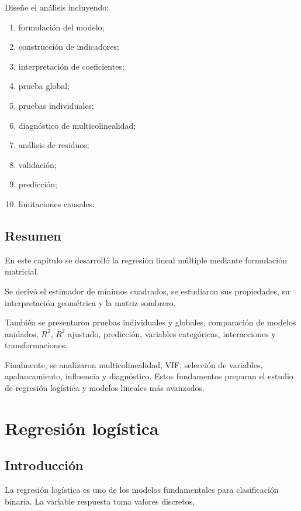 \documentclass[
  spanish,
  11pt,
  letterpaper,
  DIV=11,
  numbers=noendperiod]{scrreprt}
\providecommand{\tightlist}{%
  \setlength{\itemsep}{0pt}\setlength{\parskip}{0pt}}
\theoremstyle{definition}
\theoremstyle{plain}
\theoremstyle{definition}
\theoremstyle{remark}
\begin{document}
Diseñe el análisis incluyendo:

\begin{enumerate}
\def\labelenumi{\arabic{enumi}.}
\tightlist
\item
  formulación del modelo;
\item
  construcción de indicadores;
\item
  interpretación de coeficientes;
\item
  prueba global;
\item
  pruebas individuales;
\item
  diagnóstico de multicolinealidad;
\item
  análisis de residuos;
\item
  validación;
\item
  predicción;
\item
  limitaciones causales.
\end{enumerate}

\section{Resumen}\label{resumen-9}

En este capítulo se desarrolló la regresión lineal múltiple mediante
formulación matricial.

Se derivó el estimador de mínimos cuadrados, se estudiaron sus
propiedades, su interpretación geométrica y la matriz sombrero.

También se presentaron pruebas individuales y globales, comparación de
modelos anidados, \(R^2\), \(R^2\) ajustado, predicción, variables
categóricas, interacciones y transformaciones.

Finalmente, se analizaron multicolinealidad, VIF, selección de
variables, apalancamiento, influencia y diagnóstico. Estos fundamentos
preparan el estudio de regresión logística y modelos lineales más
avanzados.

\chapter{Regresión logística}\label{sec-regresion-logistica}

\section{Introducción}\label{introducciuxf3n-11}

La regresión logística es uno de los modelos fundamentales para
clasificación binaria. La variable respuesta toma valores discretos,
\end{document}
